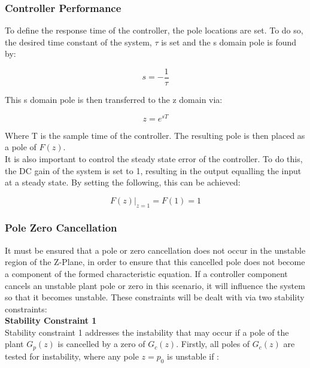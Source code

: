 \subsubsection{Controller Performance}

To define the response time of the controller, the pole locations are set. To do so, the desired time constant of the system, $\tau$ is set and the s domain pole is found by:

\begin{equation}
s = -\frac{1}{\tau}
\end{equation}

This s domain pole is then transferred to the z domain via:

\begin{equation}
z = e^{sT}
\end{equation}

Where T is the sample time of the controller. The resulting pole is then placed as a pole of $F(z)$.\\

It is also important to control the steady state error of the controller. To do this, the DC gain of the system is set to 1, resulting in the output equalling the input at a steady state. By setting the following, this can be achieved:

\begin{equation}
F(z)|_{z=1} = F(1) = 1
\end{equation}

\subsubsection{Pole Zero Cancellation}

It must be ensured that a pole or zero cancellation does not occur in the unstable region of the Z-Plane, in order to ensure that this cancelled pole does not become a component of the formed characteristic equation. If a controller component cancels an unstable plant pole or zero in this scenario, it will influence the system so that it becomes unstable. These constraints will be dealt with via two stability constraints:\\

\textbf{Stability Constraint 1}\\
Stability constraint 1 addresses the instability that may occur if a pole of the plant $G_p(z)$ is cancelled by a zero of $G_c(z)$. Firstly, all poles of $G_c(z)$ are tested for instability, where any pole $z = p_0$ is unstable if :

